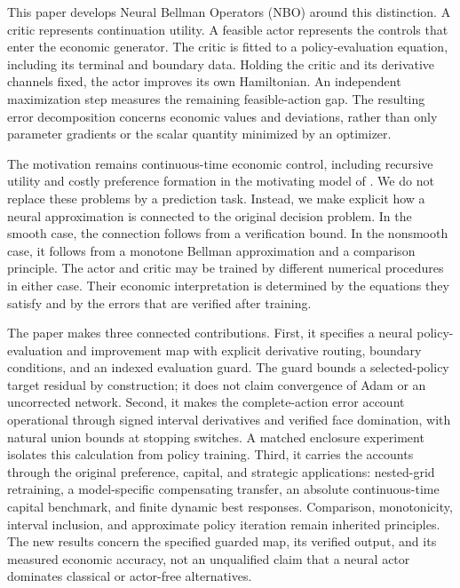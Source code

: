 \documentclass[ecta,draft]{econsocart}
\theoremstyle{definition}
\theoremstyle{remark}
\begin{document}
This paper develops Neural Bellman Operators (NBO) around this distinction. A critic represents continuation utility. A feasible actor represents the controls that enter the economic generator. The critic is fitted to a policy-evaluation equation, including its terminal and boundary data. Holding the critic and its derivative channels fixed, the actor improves its own Hamiltonian. An independent maximization step measures the remaining feasible-action gap. The resulting error decomposition concerns economic values and deviations, rather than only parameter gradients or the scalar quantity minimized by an optimizer.

The motivation remains continuous-time economic control, including recursive utility and costly preference formation in the motivating model of \citet{qi2025}. We do not replace these problems by a prediction task. Instead, we make explicit how a neural approximation is connected to the original decision problem. In the smooth case, the connection follows from a verification bound. In the nonsmooth case, it follows from a monotone Bellman approximation and a comparison principle. The actor and critic may be trained by different numerical procedures in either case. Their economic interpretation is determined by the equations they satisfy and by the errors that are verified after training.

The paper makes three connected contributions. First, it specifies a neural policy-evaluation and improvement map with explicit derivative routing, boundary conditions, and an indexed evaluation guard. The guard bounds a selected-policy target residual by construction; it does not claim convergence of Adam or an uncorrected network. Second, it makes the complete-action error account operational through signed interval derivatives and verified face domination, with natural union bounds at stopping switches. A matched enclosure experiment isolates this calculation from policy training. Third, it carries the accounts through the original preference, capital, and strategic applications: nested-grid retraining, a model-specific compensating transfer, an absolute continuous-time capital benchmark, and finite dynamic best responses. Comparison, monotonicity, interval inclusion, and approximate policy iteration remain inherited principles. The new results concern the specified guarded map, its verified output, and its measured economic accuracy, not an unqualified claim that a neural actor dominates classical or actor-free alternatives.
\end{document}
